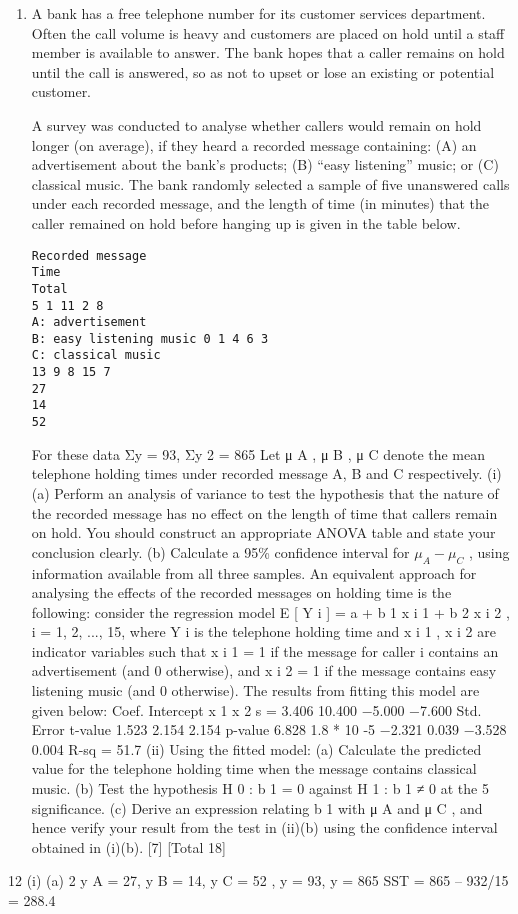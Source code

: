\documentclass[a4paper,12pt]{article}
\begin{document}
\begin{enumerate}

\item A bank has a free telephone number for its customer services department. Often the call volume is heavy and customers are placed on hold until a staff member is available to answer. The bank hopes that a caller remains on hold until the call is
answered, so as not to upset or lose an existing or potential customer.

A survey was conducted to analyse whether callers would remain on hold longer (on average), if they heard a recorded message containing: (A) an advertisement about the bank’s products; (B) “easy listening” music; or (C) classical music. The bank
randomly selected a sample of five unanswered calls under each recorded message, and the length of time (in minutes) that the caller remained on hold before hanging up is given in the table below.
\begin{verbatim}
Recorded message
Time
Total
5 1 11 2 8
A: advertisement
B: easy listening music 0 1 4 6 3
C: classical music
13 9 8 15 7
27
14
52
\end{verbatim}
For these data Σy = 93, Σy 2 = 865
Let μ A , μ B , μ C denote the mean telephone holding times under recorded message A, B and C respectively.
(i)
(a) Perform an analysis of variance to test the hypothesis that the nature of the recorded message has no effect on the length of time that callers remain on hold. You should construct an appropriate ANOVA table and state your conclusion clearly.
(b) Calculate a 95\% confidence interval for $\mu_A − \mu_C$ , using information available from all three samples.
An equivalent approach for analysing the effects of the recorded messages on holding
time is the following:
consider the regression model E [ Y i ] = a + b 1 x i 1 + b 2 x i 2 , i = 1, 2, ..., 15, where
Y i is the telephone holding time and x i 1 , x i 2 are indicator variables such that x i 1 = 1 if the message for caller i contains an advertisement (and 0 otherwise), and x i 2 = 1 if the message contains easy listening music (and 0 otherwise).
The results from fitting this model are given below:
Coef.
Intercept
x 1
x 2
s = 3.406
10.400
−5.000
−7.600
Std. Error t-value
1.523
2.154
2.154
p-value
6.828 1.8 * 10 -5
−2.321
0.039
−3.528
0.004
R-sq = 51.7%
(ii)
Using the fitted model:
(a) Calculate the predicted value for the telephone holding time when the
message contains classical music.
(b) Test the hypothesis H 0 : b 1 = 0 against H 1 : b 1 ≠ 0 at the 5%
significance.
(c) Derive an expression relating b 1 with μ A and μ C , and hence verify
your result from the test in (ii)(b) using the confidence interval
obtained in (i)(b).
[7]
[Total 18]
\end{enumerate}
\newpage
12
(i)
(a)
2
y A = 27, y B = 14, y C = 52 , y = 93, y = 865
SST = 865 – 932/15 = 288.4
\end{document}
